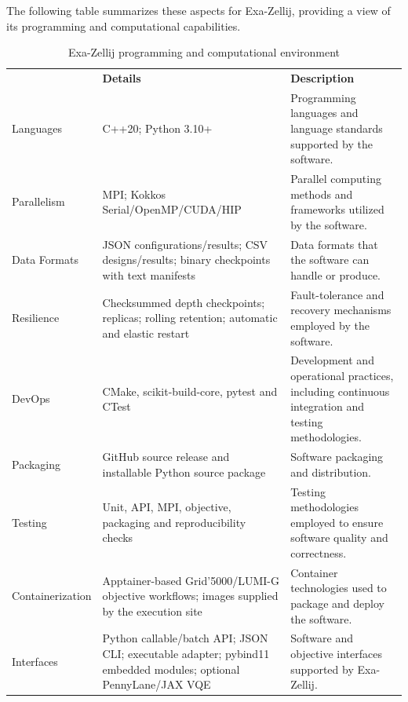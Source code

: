 The following table summarizes these aspects for Exa-Zellij, providing a
view of its programming and computational capabilities.

\begin{table}[ht!]
      \centering
      {
      \setlength{\parindent}{0pt}
      \def\arraystretch{1.25}
      {\fontsize{9}{11}\selectfont
      \begin{tabular}{
  >{\raggedright\arraybackslash}p{}
  >{\raggedright\arraybackslash}p{}
  >{\raggedright\arraybackslash}p{}}
          \rowcolor{numpexgray}{\rule{0pt}{2.5ex}\color{white}\bf Category}
& {\rule{0pt}{2.5ex}\color{white}\bf Details}
& {\rule{0pt}{2.5ex}\color{white}\bf Description}\\
          \rowcolor{white}Languages &
C++20; Python 3.10+ &
Programming languages and language standards supported by the software.\\
          \rowcolor{numpexlightergray}Parallelism &
MPI; Kokkos Serial/OpenMP/CUDA/HIP &
Parallel computing methods and frameworks utilized by the software.\\
          \rowcolor{white}Data Formats &
JSON configurations/results; CSV designs/results; binary checkpoints
with text manifests &
Data formats that the software can handle or produce.\\
          \rowcolor{numpexlightergray}Resilience &
Checksummed depth checkpoints; replicas; rolling retention; automatic
and elastic restart &
Fault-tolerance and recovery mechanisms employed by the software.\\
          \rowcolor{white}DevOps &
CMake, scikit-build-core, pytest and CTest &
Development and operational practices, including continuous integration
and testing methodologies.\\
          \rowcolor{numpexlightergray}Packaging &
GitHub source release and installable Python source package &
Software packaging and distribution.\\
          \rowcolor{white}Testing &
Unit, API, MPI, objective, packaging and reproducibility checks &
Testing methodologies employed to ensure software quality and correctness.\\
          \rowcolor{numpexlightergray}Containerization &
Apptainer-based Grid'5000/LUMI-G objective workflows; images supplied by
the execution site &
Container technologies used to package and deploy the software.\\
          \rowcolor{white}Interfaces &
Python callable/batch API; JSON CLI; executable adapter; pybind11
embedded modules; optional PennyLane/JAX VQE &
Software and objective interfaces supported by Exa-Zellij.\\
          \bottomrule
      \end{tabular}
      }}
      \caption{Exa-Zellij programming and computational environment}
\end{table}

